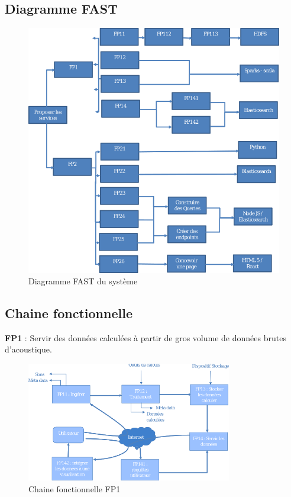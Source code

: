 \documentclass[a4paper]{article}
\begin{document}
\newpage
\subsection{Diagramme FAST}

\begin{figure}[h]
	\centering
	\includegraphics[width=\textwidth]{./tmp/DiagFast.png}
	\caption{Diagramme FAST du système}
\end{figure}

\newpage
\subsection{Chaine fonctionnelle}

\textbf{FP1} : Servir des données calculées à partir de gros volume de données brutes d’acoustique.

\begin{figure}[h]
	\centering
	\includegraphics[width=0.8\textwidth]{./tmp/ChaineFonct.png}
	\caption{Chaine fonctionnelle FP1}
\end{figure}
\end{document}
